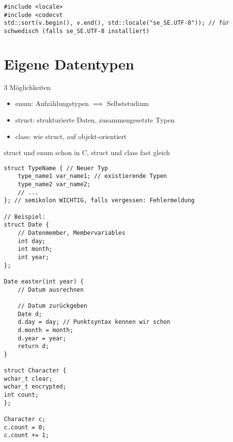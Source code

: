 \documentclass[a4paper]{scrartcl}
\theoremstyle{definition}
\theoremstyle{plain}
\theoremstyle{remark}
\theoremstyle{remark}
\begin{document}
\begin{verbatim}
#include <locale>
#include <codecvt
std::sort(v.begin(), v.end(), std::locale("se_SE.UTF-8")); // für schwedisch (falls se_SE.UTF-8 installiert)
\end{verbatim}
\section{Eigene Datentypen}
\label{sec-18}
3 Möglichkeiten
\begin{itemize}
\item enum: Aufzählungstypen $\implies$ Selbststudium
\item struct: strukturierte Daten, zusammengesetzte Typen
\item class: wie struct, auf objekt-orientiert
\end{itemize}
struct und enum schon in C, struct und class fast gleich
\begin{verbatim}
struct TypeName { // Neuer Typ
	type_name1 var_name1; // existierende Typen
	type_name2 var_name2;
	// ...
}; // semikolon WICHTIG, falls vergessen: Fehlermeldung

// Beispiel:
struct Date {
	// Datenmember, Membervariables
	int day;
	int month;
	int year;
};

Date easter(int year) {
	// Datum ausrechnen

	// Datum zurückgeben
	Date d;
	d.day = day; // Punktsyntax kennen wir schon
	d.month = month;
	d.year = year;
	return d;
}

struct Character {
wchar_t clear;
wchar_t encrypted;
int count;
};

Character c;
c.count = 0;
c.count += 1;
\end{verbatim}
\end{document}
